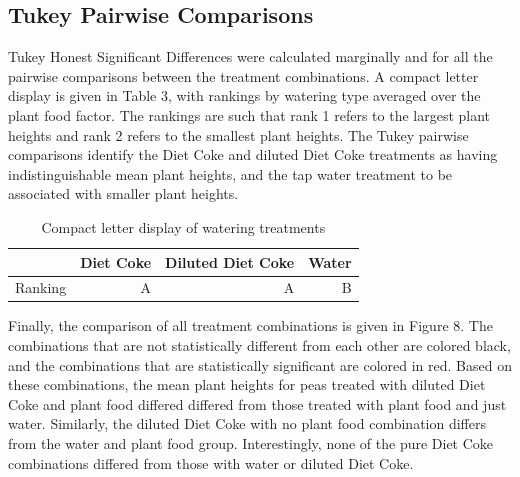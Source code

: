 \documentclass[1p,12pt]{elsarticle}\usepackage[]{graphicx}\usepackage[]{color}
\begin{document}
\subsection{Tukey Pairwise Comparisons}

Tukey Honest Significant Differences were calculated marginally and for all the pairwise comparisons between the treatment combinations. A compact letter display is given in Table 3, with rankings by watering type averaged over the plant food factor. The rankings are such that rank 1 refers to the largest plant heights and rank 2 refers to the smallest plant heights.  The Tukey pairwise comparisons identify the Diet Coke and diluted Diet Coke treatments as having indistinguishable mean plant heights, and the tap water treatment to be associated with smaller plant heights. 

\begin{table}[ht]
\centering
\begin{tabular}{lrrr}
  \hline
 & Diet Coke & Diluted Diet Coke & Water \\ 
  \hline
Ranking & A & A & B \\ 
  
   \hline
\end{tabular}
\caption{Compact letter display of watering treatments}
\end{table}

Finally, the comparison of all treatment combinations is given in Figure 8.  The combinations that are not statistically different from each other are colored black, and the combinations that are statistically significant are colored in red. Based on these combinations, the mean plant heights for peas treated with diluted Diet Coke and plant food differed differed from those treated with plant food and just water. Similarly, the diluted Diet Coke with no plant food combination differs from the water and plant food group. Interestingly, none of the pure Diet Coke combinations differed from those with water or diluted Diet Coke. 
\end{document}
